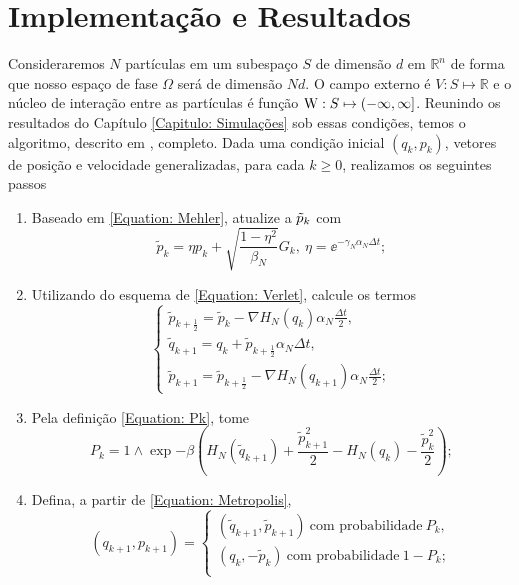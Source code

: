 \chapter{Implementação e Resultados}
\label{Capitulo: Resultados}

Consideraremos $N$ partículas em um subespaço $S$ de dimensão $d$ em $\mathbb{R}^n$ de forma que nosso espaço de fase $\Omega$ será de dimensão $Nd$. O campo externo é $V : S \mapsto \mathbb{R}$ e o núcleo de interação entre as partículas é função $\operatorname{W} : S \mapsto (-\infty, \infty]$. Reunindo os resultados do Capítulo \ref{Capitulo: Simulações} sob essas condições, temos o algoritmo, descrito em \cite{Chafa2018}, completo. Dada uma condição inicial $(q_k, p_k)$,  vetores de posição e velocidade generalizadas, para cada $k\geq0$, realizamos os seguintes passos
\begin{enumerate}
	\item Baseado em \ref{Equation: Mehler}, atualize a $\tilde{p}_k$ com
	\begin{equation}
	\tilde{p}_k = \eta p_k + \sqrt{\frac{1-\eta^2}{\beta_N}} G_k, \ \eta = \ee^{-\gamma_N \alpha_N \Delta t};
	\label{Equation: Alg Mehler}
	\end{equation}
	\item Utilizando do esquema de \ref{Equation: Verlet}, calcule os termos
	\begin{equation}
	\begin{cases}
		\tilde{p}_{k+\frac{1}{2}} = \tilde{p}_k - \nabla H_N(q_k) \alpha_N \frac{\Delta t}{2}, \\
		\tilde{q}_{k+1} = q_k + \tilde{p}_{k + \frac{1}{2}} \alpha_N \Delta t, \\
		\tilde{p}_{k+1} = \tilde{p}_{k+\frac{1}{2}} - \nabla H_N(q_{k+1}) \alpha_N \frac{\Delta t}{2};
		\label{Equation: Alg Verlet}
	\end{cases}
	\end{equation}
	\item Pela definição \ref{Equation: Pk}, tome
	\begin{equation}
	P_k = 1 \wedge \exp{ -\beta \left( H_N(\tilde{q}_{k+1}) + \frac{\tilde{p}^2_{k+1}}{2} - H_N(q_k) - \frac{\tilde{p}^2_k}{2} \right) };
	\label{Equação: Alg Pk}
	\end{equation}
	\item Defina, a partir de \ref{Equation: Metropolis}, 
	\begin{equation}
	(q_{k+1}, p_{k+1}) = 
	\begin{cases}
		(\tilde{q}_{k+1}, \tilde{p}_{k+1}) \ \text{com probabilidade} \ P_k, \\
		(q_k, -\tilde{p}_{k}) \ \text{com probabilidade} \ 1-P_k; \\
	\end{cases}
	\label{Equation: Alg Metro}
	\end{equation}
\end{enumerate}


